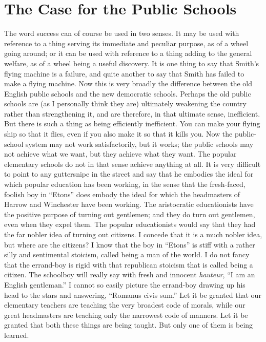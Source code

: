 \documentclass{book}
\begin{document}
\chapter{The Case for the Public Schools}
\label{chapter-41}
The word success can of course be used in two senses. It may be used with reference to a thing serving its immediate and peculiar purpose, as of a wheel going around; or it can be used with reference to a thing adding to the general welfare, as of a wheel being a useful discovery. It is one thing to say that Smith’s flying machine is a failure, and quite another to say that Smith has failed to make a flying machine. Now this is very broadly the difference between the old English public schools and the new democratic schools. Perhaps the old public schools are (as I personally think they are) ultimately weakening the country rather than strengthening it, and are therefore, in that ultimate sense, inefficient. But there is such a thing as being efficiently inefficient. You can make your flying ship so that it flies, even if you also make it so that it kills you. Now the public-school system may not work satisfactorily, but it works; the public schools may not achieve what we want, but they achieve what they want. The popular elementary schools do not in that sense achieve anything at all. It is very difficult to point to any guttersnipe in the street and say that he embodies the ideal for which popular education has been working, in the sense that the fresh-faced, foolish boy in “Etons” does embody the ideal for which the headmasters of Harrow and Winchester have been working. The aristocratic educationists have the positive purpose of turning out gentlemen; and they do turn out gentlemen, even when they expel them. The popular educationists would say that they had the far nobler idea of turning out citizens. I concede that it is a much nobler idea, but where are the citizens? I know that the boy in “Etons” is stiff with a rather silly and sentimental stoicism, called being a man of the world. I do not fancy that the errand-boy is rigid with that republican stoicism that is called being a citizen. The schoolboy will really say with fresh and innocent \emph{hauteur}, “I am an English gentleman.” I cannot so easily picture the errand-boy drawing up his head to the stars and answering, “Romanus civis sum.” Let it be granted that our elementary teachers are teaching the very broadest code of morals, while our great headmasters are teaching only the narrowest code of manners. Let it be granted that both these things are being taught. But only one of them is being learned.
\end{document}
